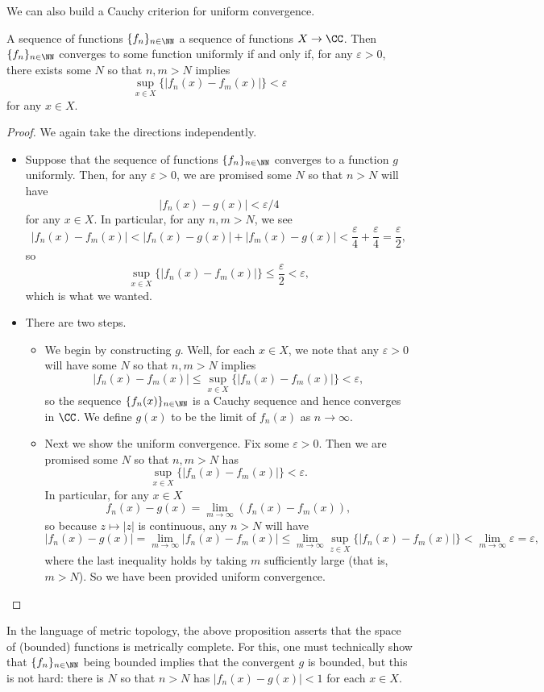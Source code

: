 We can also build a Cauchy criterion for uniform convergence.
\begin{prop}
	A sequence of functions $\{f_n\}_{n\in\NN}$ a sequence of functions $X\to\CC$. Then $\{f_n\}_{n\in\NN}$ converges to some function uniformly if and only if, for any $\varepsilon>0$, there exists some $N$ so that $n,m>N$ implies
	\[\sup_{x\in X}\{|f_n(x)-f_m(x)|\}<\varepsilon\]
	for any $x\in X$.
\end{prop}
\begin{proof}
	We again take the directions independently.
	\begin{itemize}
		\item Suppose that the sequence of functions $\{f_n\}_{n\in\NN}$ converges to a function $g$ uniformly. Then, for any $\varepsilon>0$, we are promised some $N$ so that $n>N$ will have
		\[|f_n(x)-g(x)|<\varepsilon/4\]
		for any $x\in X$. In particular, for any $n,m>N$, we see
		\[|f_n(x)-f_m(x)|<|f_n(x)-g(x)|+|f_m(x)-g(x)|<\frac\varepsilon4+\frac\varepsilon4=\frac\varepsilon2,\]
		so
		\[\sup_{x\in X}\{|f_n(x)-f_m(x)|\}\le\frac\varepsilon2<\varepsilon,\]
		which is what we wanted.
		\item There are two steps.
		\begin{itemize}
			\item We begin by constructing $g$. Well, for each $x\in X$, we note that any $\varepsilon>0$ will have some $N$ so that $n,m>N$ implies
			\[|f_n(x)-f_m(x)|\le\sup_{x\in X}\{|f_n(x)-f_m(x)|\}<\varepsilon,\]
			so the sequence $\{f_n(x)\}_{n\in\NN}$ is a Cauchy sequence and hence converges in $\CC$. We define $g(x)$ to be the limit of $f_n(x)$ as $n\to\infty$.
			\item Next we show the uniform convergence. Fix some $\varepsilon>0$. Then we are promised some $N$ so that $n,m>N$ has
			\[\sup_{x\in X}\{|f_n(x)-f_m(x)|\}<\varepsilon.\]
			In particular, for any $x\in X$
			\[f_n(x)-g(x)=\lim_{m\to\infty}(f_n(x)-f_m(x)),\]
			so because $z\mapsto|z|$ is continuous, any $n>N$ will have
			\[|f_n(x)-g(x)|=\lim_{m\to\infty}|f_n(x)-f_m(x)|\le\lim_{m\to\infty}\sup_{z\in X}\{|f_n(x)-f_m(x)|\}<\lim_{m\to\infty}\varepsilon=\varepsilon,\]
			where the last inequality holds by taking $m$ sufficiently large (that is, $m>N$). So we have been provided uniform convergence.
			\qedhere
		\end{itemize}
	\end{itemize}
\end{proof}
\begin{remark}[Nir]
	In the language of metric topology, the above proposition asserts that the space of (bounded) functions is metrically complete. For this, one must technically show that $\{f_n\}_{n\in\NN}$ being bounded implies that the convergent $g$ is bounded, but this is not hard: there is $N$ so that $n>N$ has $|f_n(x)-g(x)|<1$ for each $x\in X$.
\end{remark}
